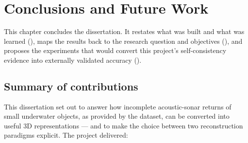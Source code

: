 \chapter{Conclusions and Future Work}
\label{ch:conclusions}

This chapter concludes the dissertation. It restates what was built and what
was learned (), maps the results back to the research
question and objectives (), and proposes the
experiments that would convert this project's self-consistency evidence into
externally validated accuracy ().

\section{Summary of contributions}
\label{sec:conc_summary}

This dissertation set out to answer how incomplete acoustic-sonar returns of
small underwater objects, as provided by the \suop{} dataset, can be converted
into useful 3D representations --- and to make the choice between two
reconstruction paradigms explicit. The project delivered:


